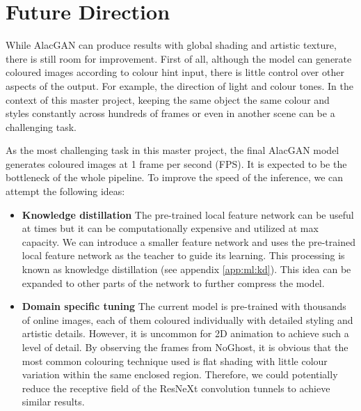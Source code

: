 \section{Future Direction}
While AlacGAN can produce results with global shading and artistic texture, there is still room for improvement. First of all, although the model can generate coloured images according to colour hint input, there is little control over other aspects of the output. For example, the direction of light and colour tones. In the context of this master project, keeping the same object the same colour and styles constantly across hundreds of frames or even in another scene can be a challenging task.

As the most challenging task in this master project, the final AlacGAN model generates coloured images at 1 frame per second (FPS). It is expected to be the bottleneck of the whole pipeline. To improve the speed of the inference, we can attempt the following ideas:

\begin{itemize}
    \item \textbf{Knowledge distillation} The pre-trained local feature network can be useful at times but it can be computationally expensive and utilized at max capacity. We can introduce a smaller feature network and uses the pre-trained local feature network as the teacher to guide its learning. This processing is known as knowledge distillation (see appendix \ref{app:ml:kd}). This idea can be expanded to other parts of the network to further compress the model.
    \item \textbf{Domain specific tuning} The current model is pre-trained with thousands of online images, each of them coloured individually with detailed styling and artistic details. However, it is uncommon for 2D animation to achieve such a level of detail. By observing the frames from NoGhost, it is obvious that the most common colouring technique used is flat shading with little colour variation within the same enclosed region. Therefore, we could potentially reduce the receptive field of the ResNeXt convolution tunnels to achieve similar results.
\end{itemize}

